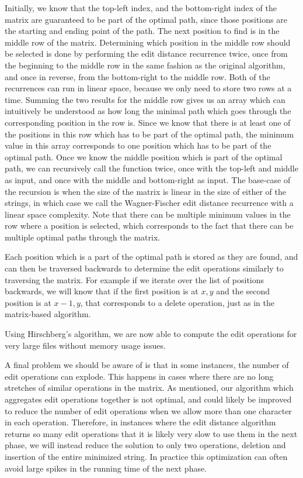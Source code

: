 Initially, we know that the top-left index, and the bottom-right index of the matrix are
guaranteed to be part of the optimal path, since those positions are the starting and
ending point of the path. The next position to find is in the middle row of the matrix.
Determining which position in the middle row should be selected is done by performing the
edit distance recurrence twice, once from the beginning to the middle row in the same
fashion as the original algorithm, and once in reverse, from the bottom-right to the
middle row. Both of the recurrences can run in linear space, because we only need to store
two rows at a time. Summing the two results for the middle row gives us an array which can
intuitively be understood as how long the minimal path which goes through the
corresponding position in the row is. Since we know that there is at least one of the
positions in this row which has to be part of the optimal path, the minimum value in this
array corresponds to one position which has to be part of the optimal path. Once we know
the middle position which is part of the optimal path, we can recursively call the
function twice, once with the top-left and middle as input, and once with the middle and
bottom-right as input. The base-case of the recursion is when the size of the matrix is
linear in the size of either of the strings, in which case we call the Wagner-Fischer edit
distance recurrence with a linear space complexity. Note that there can be multiple
minimum values in the row where a position is selected, which corresponds to the fact that
there can be multiple optimal paths through the matrix.

Each position which is a part of the optimal path is stored as they are found, and can
then be traversed backwards to determine the edit operations similarly to traversing the
matrix. For example if we iterate over the list of positions backwards, we will know that
if the first position is at $x, y$ and the second position is at $x - 1, y$, that
corresponds to a delete operation, just as in the matrix-based algorithm.

Using Hirschberg's algorithm, we are now able to compute the edit operations for very
large files without memory usage issues.

A final problem we should be aware of is that in some instances, the number of edit
operations can explode. This happens in cases where there are no long stretches of similar
operations in the matrix. As mentioned, our algorithm which aggregates edit operations
together is not optimal, and could likely be improved to reduce the number of edit
operations when we allow more than one character in each operation. Therefore, in
instances where the edit distance algorithm returns so many edit operations that it is
likely very slow to use them in the next phase, we will instead reduce the solution to
only two operations, deletion and insertion of the entire minimized string. In practice
this optimization can often avoid large spikes in the running time of the next phase.

